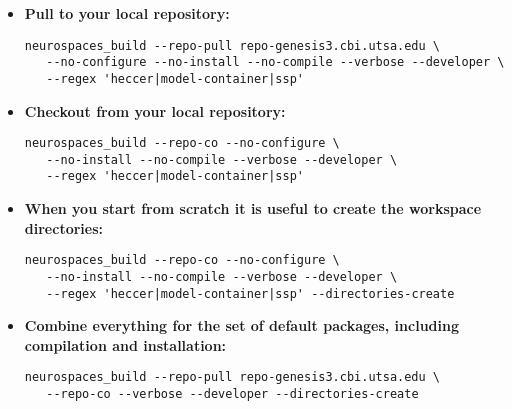 \documentclass[12pt]{article}
\begin{document}
\begin{itemize}
\item {\bf Pull to your local repository:}
\begin{verbatim}
neurospaces_build --repo-pull repo-genesis3.cbi.utsa.edu \
   --no-configure --no-install --no-compile --verbose --developer \
   --regex 'heccer|model-container|ssp'
\end{verbatim}

\item {\bf Checkout from your local repository:}
\begin{verbatim}
neurospaces_build --repo-co --no-configure \
   --no-install --no-compile --verbose --developer \
   --regex 'heccer|model-container|ssp'
\end{verbatim}

\item {\bf When you start from scratch it is useful to create the workspace directories:}
\begin{verbatim}
neurospaces_build --repo-co --no-configure \
   --no-install --no-compile --verbose --developer \
   --regex 'heccer|model-container|ssp' --directories-create
\end{verbatim}

\item {\bf Combine everything for the set of default packages, including compilation and installation:}
\begin{verbatim}
neurospaces_build --repo-pull repo-genesis3.cbi.utsa.edu \
   --repo-co --verbose --developer --directories-create
\end{verbatim}

\end{itemize}
\end{document}

